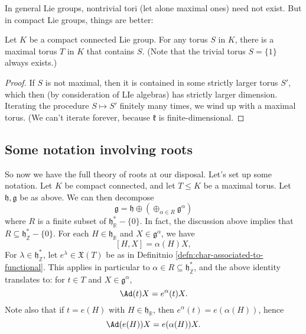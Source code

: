 \documentclass[reqno]{amsart} 
\begin{document}
In general Lie groups, nontrivial tori (let alone maximal ones) need not exist.  But in compact Lie groups, things are better:
\begin{lemma}
  Let $K$ be a compact connected Lie group.  For any torus $S$ in $K$, there is a maximal torus $T$ in $K$ that contains $S$.  (Note that the trivial torus $S = \{1\}$ always exists.)
\end{lemma}
\begin{proof}
  If $S$ is not maximal, then it is contained in some strictly larger torus $S'$, which then (by consideration of LIe algebras) has strictly larger dimension.  Iterating the procedure $S \mapsto S'$ finitely many times, we wind up with a maximal torus.  (We can't iterate forever, because $\mathfrak{k}$ is finite-dimensional.
\end{proof}

\subsection{Some notation involving roots\label{sec:notationinvolvingroots-for-amxl-tori-section}}
\label{sec:org822bc0f}
So now we have the full theory of roots at our disposal.  Let's set up some notation.  Let $K$ be compact connected, and let $T \leq K$ be a maximal torus.  Let $\mathfrak{h},\mathfrak{g}$ be as above.  We can then decompose
\begin{equation}\label{eq:root-space-decmop-for-compact-LIe-group-amxiaml-trous}
  \mathfrak{g} = \mathfrak{h} \oplus (\oplus_{\alpha \in R} \mathfrak{g}^\alpha)
\end{equation}
where $R$ is a finite subset of $\mathfrak{h}_\mathbb{R}^* - \{0\}$.  In fact, the discussion above implies that $R \subseteq \mathfrak{h}_\mathbb{Z}^* - \{0\}$.  For each $H \in \mathfrak{h}_\mathbb{R}$ and $X \in \mathfrak{g}^\alpha$, we have
\begin{equation*}
  {} [H,X] = \alpha(H) X,
\end{equation*}
For $\lambda \in \mathfrak{h}_\mathbb{Z}^*$, let $e^\lambda \in \mathfrak{X}(T)$ be as in Definitnio \ref{defn:char-associated-to-functional}.  This applies in particular to $\alpha \in R \subseteq \mathfrak{h}_\mathbb{Z}^*$, and the above identity translates to: for $t \in T$ and $X \in \mathfrak{g}^\alpha$,
\begin{equation*}
  \Ad(t) X = e^\alpha (t) X.
\end{equation*}
Note also that if $t = e(H)$ with $H \in \mathfrak{h}_\mathbb{R}$, then $e^\alpha (t) = e(\alpha(H))$, hence
\begin{equation}\label{eq:how-ad-e-H-acts-on-X}
  \Ad(e(H)) X = e(\alpha(H)) X.
\end{equation}
\end{document}
